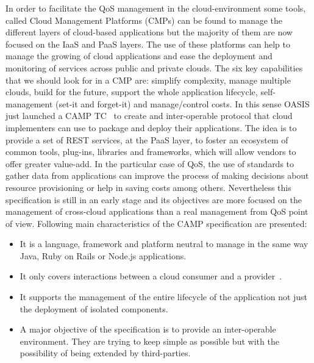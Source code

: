 In order to facilitate the QoS management in the cloud-environment some tools, called Cloud Management Platforms (CMPs) can be found 
to manage the different layers of cloud-based applications but the majority of them are now focused on the IaaS and PaaS layers. 
The use of these platforms can help to manage the growing of cloud applications and ease the deployment and monitoring of services across 
public and private clouds. The six key capabilities~\cite{Kephart2012} that we should look for in a CMP are: simplify complexity, 
manage multiple clouds, build for the future, support the whole application lifecycle, self-management (set-it and forget-it) and manage/control costs. 
In this sense OASIS just launched a CAMP TC~\cite{OASISCamp} to create and inter-operable protocol that cloud 
implementers can use to package and deploy their applications. The idea is to provide a set of REST services, at the PaaS layer, to foster an ecosystem of 
common tools, plug-ins, libraries and frameworks, which will allow vendors to offer greater value-add. In the particular case of QoS, the use of standards to gather data 
from applications can improve the process of making decisions about resource provisioning or help in saving costs among others. Nevertheless 
this specification is still in an early stage and its objectives are more focused on the management of cross-cloud applications than a 
real management from QoS point of view. Following main characteristics of the CAMP specification are presented:
\begin{itemize}
 \item It is a language, framework and platform neutral to manage in the same way Java, Ruby on Rails or Node.js applications.
 \item It only covers interactions between a cloud consumer and a provider~\cite{mell2011nist}.
 \item It supports the management of the entire lifecycle of the application not just the deployment of isolated components.
 \item A major objective of the specification is to provide an inter-operable environment. They are trying to keep simple as 
 possible but with the possibility of being extended by third-parties.
\end{itemize}

